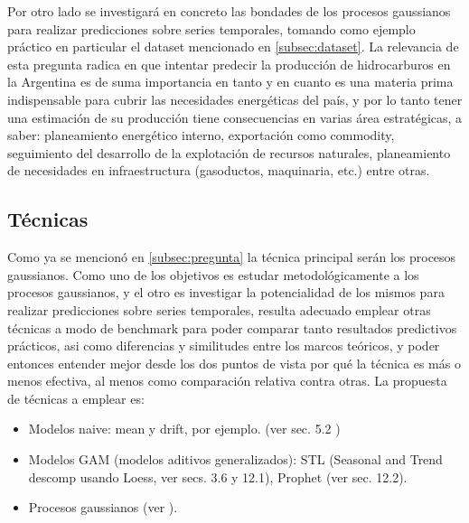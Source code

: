 \documentclass[a4paper]{article}
\begin{document}
Por otro lado se investigará en concreto las bondades de los procesos gaussianos para realizar predicciones sobre series temporales, tomando como ejemplo práctico en particular el dataset mencionado en \ref{subsec:dataset}. La relevancia de esta pregunta radica en que intentar predecir la producción de hidrocarburos en la Argentina es de suma importancia en tanto y en cuanto es una materia prima indispensable para cubrir las necesidades energéticas del país, y por lo tanto tener una estimación de su producción tiene consecuencias en varias área estratégicas, a saber: planeamiento energético interno, exportación como commodity, seguimiento del desarrollo de la explotación de recursos naturales, planeamiento de necesidades en infraestructura (gasoductos, maquinaria, etc.) entre otras.


\subsection{Técnicas}
Como ya se mencionó en \ref{subsec:pregunta} la técnica principal serán los procesos gaussianos. Como uno de los objetivos es estudar metodológicamente a los procesos gaussianos, y el otro es investigar la potencialidad de los mismos para realizar predicciones sobre series temporales, resulta adecuado emplear otras técnicas a modo de benchmark para poder comparar tanto resultados predictivos prácticos, asi como diferencias y similitudes entre los marcos teóricos, y poder entonces entender mejor desde los dos puntos de vista por qué la técnica es más o menos efectiva, al menos como comparación relativa contra otras. La propuesta de técnicas a emplear es:
 
\begin{itemize}
	\item Modelos naive: mean y drift, por ejemplo. (ver \cite{hyndman} sec. 5.2 )
	\item Modelos GAM (modelos aditivos generalizados): STL (Seasonal and Trend descomp usando Loess, ver \cite{hyndman} secs. 3.6 y 12.1), Prophet (ver \cite{hyndman} sec. 12.2).
	\item Procesos gaussianos (ver \cite{gramacy, tobar, rasmussen, murphy}).
\end{itemize}
\end{document}
